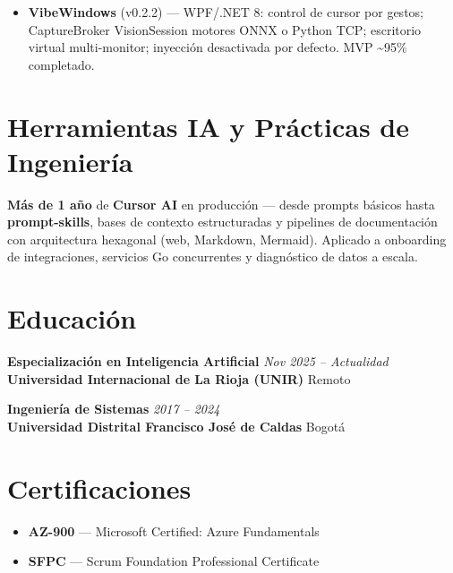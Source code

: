 \begin{itemize}
  \item \textbf{VibeWindows} (v0.2.2) — WPF/.NET 8: control de cursor por gestos; CaptureBroker \textrightarrow{}
        VisionSession \textrightarrow{} motores ONNX o Python TCP; escritorio virtual multi-monitor;
        inyección desactivada por defecto. MVP \textasciitilde{}95\% completado.
\end{itemize}

\section*{Herramientas IA y Prácticas de Ingeniería}

\textbf{Más de 1 año} de \textbf{Cursor AI} en producción — desde prompts básicos hasta \textbf{prompt-skills},
bases de contexto estructuradas y pipelines de documentación con arquitectura hexagonal (web, Markdown,
Mermaid). Aplicado a onboarding de integraciones, servicios Go concurrentes y diagnóstico de datos a escala.

\section*{Educación}

\noindent\textbf{\color{dark}Especialización en Inteligencia Artificial} \hfill \textit{\color{light}Nov 2025 – Actualidad} \\
\textbf{\color{accent}Universidad Internacional de La Rioja (UNIR)} \hfill \textcolor{light}{Remoto}

\vspace{5pt}

\noindent\textbf{\color{dark}Ingeniería de Sistemas} \hfill \textit{\color{light}2017 – 2024} \\
\textbf{\color{accent}Universidad Distrital Francisco José de Caldas} \hfill \textcolor{light}{Bogotá}

\section*{Certificaciones}

\begin{itemize}
  \item \textbf{AZ-900} — Microsoft Certified: Azure Fundamentals
  \item \textbf{SFPC} — Scrum Foundation Professional Certificate
\end{itemize}
